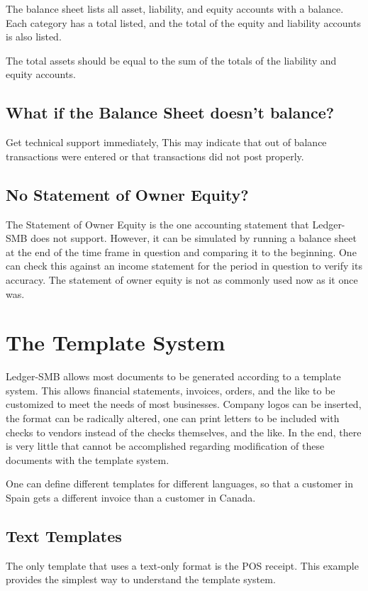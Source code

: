 \documentclass{article}
\begin{document}
The balance sheet lists all asset, liability, and equity accounts with a
balance.  Each category has a total listed, and the total of the equity and
liability accounts is also listed.

The total assets should be equal to the sum of the totals of the liability and
equity accounts.

\subsection{What if the Balance Sheet doesn't balance?}

Get technical support immediately,  This may indicate that out of balance
transactions were entered or that transactions did not post properly.

\subsection{No Statement of Owner Equity?}

The Statement of Owner Equity is the one accounting statement that Ledger-SMB
does not support.  However, it can be simulated by running a balance sheet at
the end of the time frame in question and comparing it to the beginning.  One
can check this against an income statement for the period in question to verify
its accuracy.  The statement of owner equity is not as commonly used now as it
once was.

\section{The Template System}
Ledger-SMB allows most documents to be generated according to a template system.
This allows financial statements, invoices, orders, and the like to be
customized to meet the needs of most businesses.  Company logos can be inserted,
the format can be radically altered, one can print letters to be included with
checks to vendors instead of the checks themselves, and the like.  In the end,
there is very little that cannot be accomplished regarding modification of these
documents with the template system.

One can define different templates for different languages, so that a customer
in Spain gets a different invoice than a customer in Canada.

\subsection{Text Templates}
The only template that uses a text-only format is the POS receipt.  This example
provides the simplest way to understand the template system.
\end{document}
